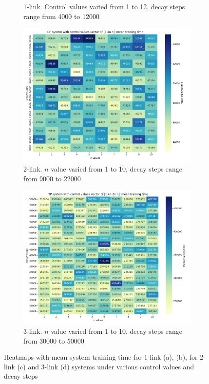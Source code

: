 \begin{figure}[h!]
\begin{subfigure}[t]{0.48\textwidth}
		\caption{1-link. Control values varied from 1 to 12, decay steps range from 4000 to 12000}
	\end{subfigure}
	\begin{subfigure}[t]{0.48\textwidth}
		\centering
		\includegraphics[width=\textwidth]{Figures/DP_1_4n_n_heatmap_mean.png}
		\caption{2-link. $n$ value varied from 1 to 10, decay steps range from 9000 to 22000}
	\end{subfigure}
	\begin{subfigure}[t]{0.48\textwidth}
		\centering
		\includegraphics[width=\textwidth]{Figures/TP_1_4n_2n_n_heatmap_mean.png}
		\caption{3-link. $n$ value varied from 1 to 10, decay steps range from 30000 to 50000}
	\end{subfigure}
	
	\caption{Heatmaps with mean system training time for 1-link (a), (b), for 2-link (c) and 3-link (d) systems under various control values and decay steps}
	\label{fig: CL heatmaps}
\end{figure}

